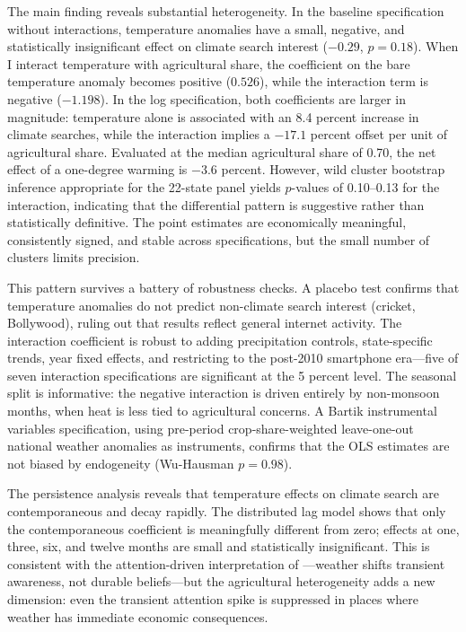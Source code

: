 \documentclass[12pt]{article}
\begin{document}
The main finding reveals substantial heterogeneity. In the baseline specification without interactions, temperature anomalies have a small, negative, and statistically insignificant effect on climate search interest ($-0.29$, $p = 0.18$). When I interact temperature with agricultural share, the coefficient on the bare temperature anomaly becomes positive ($0.526$), while the interaction term is negative ($-1.198$). In the log specification, both coefficients are larger in magnitude: temperature alone is associated with an 8.4 percent increase in climate searches, while the interaction implies a $-17.1$ percent offset per unit of agricultural share. Evaluated at the median agricultural share of 0.70, the net effect of a one-degree warming is $-3.6$ percent. However, wild cluster bootstrap inference appropriate for the 22-state panel yields $p$-values of 0.10--0.13 for the interaction, indicating that the differential pattern is suggestive rather than statistically definitive. The point estimates are economically meaningful, consistently signed, and stable across specifications, but the small number of clusters limits precision.

This pattern survives a battery of robustness checks. A placebo test confirms that temperature anomalies do not predict non-climate search interest (cricket, Bollywood), ruling out that results reflect general internet activity. The interaction coefficient is robust to adding precipitation controls, state-specific trends, year fixed effects, and restricting to the post-2010 smartphone era---five of seven interaction specifications are significant at the 5 percent level. The seasonal split is informative: the negative interaction is driven entirely by non-monsoon months, when heat is less tied to agricultural concerns. A Bartik instrumental variables specification, using pre-period crop-share-weighted leave-one-out national weather anomalies as instruments, confirms that the OLS estimates are not biased by endogeneity (Wu-Hausman $p = 0.98$).

The persistence analysis reveals that temperature effects on climate search are contemporaneous and decay rapidly. The distributed lag model shows that only the contemporaneous coefficient is meaningfully different from zero; effects at one, three, six, and twelve months are small and statistically insignificant. This is consistent with the attention-driven interpretation of \citet{eganmullin2012}---weather shifts transient awareness, not durable beliefs---but the agricultural heterogeneity adds a new dimension: even the transient attention spike is suppressed in places where weather has immediate economic consequences.
\end{document}
